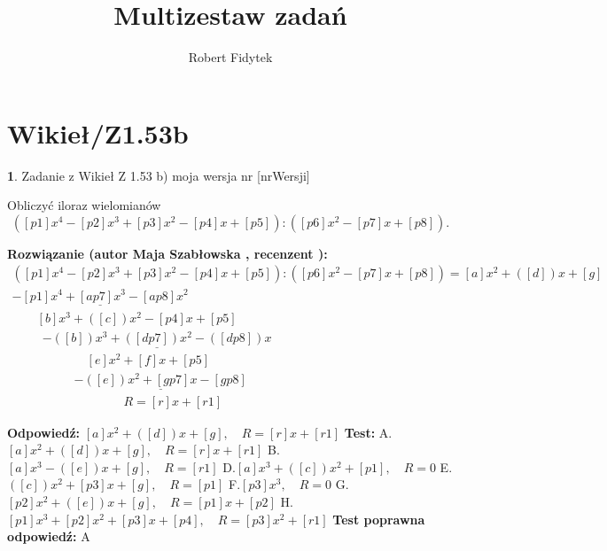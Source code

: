 \documentclass[12pt, a4paper]{article}
\title{Multizestaw zadań}
\author{Robert Fidytek}
\date{}
\theoremstyle{definition} %
\newtheorem{zad}{}
\newcommand{\kategoria}[1]{\section{#1}} %
\newcommand{\zadStart}[1]{\begin{zad}#1\newline} %
\newcommand{\zadStop}{\end{zad}}   %
\newcommand{\rozwStart}[2]{\noindent \textbf{Rozwiązanie (autor #1 , recenzent #2): }\newline} %
\newcommand{\rozwStop}{\newline}                                            %
\newcommand{\odpStart}{\noindent \textbf{Odpowiedź:}\newline}    %
\newcommand{\odpStop}{\newline}                                             %
\newcommand{\testStart}{\noindent \textbf{Test:}\newline} %
\newcommand{\testStop}{\newline} %
\newcommand{\kluczStart}{\noindent \textbf{Test poprawna odpowiedź:}\newline} %
\newcommand{\kluczStop}{\newline} %
\begin{document}
\maketitle


\kategoria{Wikieł/Z1.53b}
\zadStart{Zadanie z Wikieł Z 1.53 b)  moja wersja nr [nrWersji]}

Obliczyć iloraz wielomianów $$([p1]x^{4}-[p2]x^{3}+[p3]x^{2}-[p4]x+[p5]):([p6]x^{2}-[p7]x+[p8]).$$

\zadStop

\rozwStart{Maja Szabłowska}{}
$$\begin{array}{lll}
([p1]x^{4}-[p2]x^{3}+[p3]x^{2}-[p4]x+[p5]):([p6]x^{2}-[p7]x+[p8])  =   [a]x^2  +([d])x +[g] \\
\underline{-[p1]x^4 +[ap7]x^3-[ap8]x^{2}} & &  \\
\qquad [b]x^3 + ([c])x^2 -[p4]x +[p5] & & \\
\qquad \ \ \underline{-([b])x^3 +([dp7])x^2 -([dp8])x} & &\\
\qquad \qquad \qquad [e]x^2 + [f]x + [p5] & & \\
\qquad \qquad \quad \underline{-([e])x^2 + [gp7]x - [gp8]}  & & \\
\qquad \qquad \qquad \qquad \quad R = [r]x+[r1] & &
\end{array}$$
\rozwStop


\odpStart
$[a]x^2  +([d])x +[g], \quad R = [r]x+[r1]$
\odpStop
\testStart
A.$[a]x^2  +([d])x +[g], \quad R = [r]x+[r1]$
B.$[a]x^3 - ([e])x +[g], \quad R = [r1]$
D.$[a]x^3 +([c])x^2 +[p1], \quad R = 0$
E.$([c])x^2 + [p3]x +[g], \quad R = [p1]$
F.$[p3]x^3 , \quad R = 0$
G.$[p2]x^2 + ([e])x +[g], \quad R = [p1]x+[p2]$
H.$[p1]x^3 +[p2]x^2 + [p3]x +[p4], \quad R = [p3]x^{2}+[r1]$
\testStop
\kluczStart
A
\kluczStop
\end{document}
